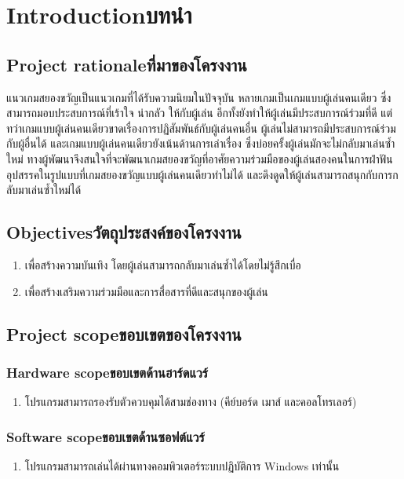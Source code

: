 \chapter{\ifenglish Introduction\else บทนำ\fi}

\section{\ifenglish Project rationale\else ที่มาของโครงงาน\fi}
แนวเกมสยองขวัญเป็นแนวเกมที่ได้รับความนิยมในปัจจุบัน หลายเกมเป็นเกมแบบผู้เล่นคนเดียว ซึ่งสามารถมอบประสบการณ์ที่เร้าใจ น่ากลัว ให้กับผู้เล่น อีกทั้งยังทำให้ผู้เล่นมีประสบการณ์ร่วมที่ดี แต่ทว่าเกมแบบผู้เล่นคนเดียวขาดเรื่องการปฏิสัมพันธ์กับผู้เล่นคนอื่น ผู้เล่นไม่สามารถมีประสบการณ์ร่วมกับผู้อื่นได้ และเกมแบบผู้เล่นคนเดียวยังเน้นด้านการเล่าเรื่อง ซึ่งบ่อยครั้งผู้เล่นมักจะไม่กลับมาเล่นซ้ำใหม่ ทางผู้พัฒนาจึงสนใจที่จะพัฒนาเกมสยองขวัญที่อาศัยความร่วมมือของผู้เล่นสองคนในการฝ่าฟันอุปสรรคในรูปแบบที่เกมสยองขวัญแบบผู้เล่นคนเดียวทำไม่ได้ และดึงดูดให้ผู้เล่นสามารถสนุกกับการกลับมาเล่นซ้ำใหม่ได้

\section{\ifenglish Objectives\else วัตถุประสงค์ของโครงงาน\fi}
\begin{enumerate}
    \item เพื่อสร้างความบันเทิง โดยผู้เล่นสามารถกลับมาเล่นซ้ำได้โดยไม่รู้สึกเบื่อ
    \item เพื่อสร้างเสริมความร่วมมือและการสื่อสารที่ดีและสนุกของผู้เล่น
\end{enumerate}

\section{\ifenglish Project scope\else ขอบเขตของโครงงาน\fi}

\subsection{\ifenglish Hardware scope\else ขอบเขตด้านฮาร์ดแวร์\fi}
\begin{enumerate}
    \item โปรแกรมสามารถรองรับตัวควบคุมได้สามช่องทาง (คีย์บอร์ด เมาส์ และคอลโทรเลอร์)
\end{enumerate}

\subsection{\ifenglish Software scope\else ขอบเขตด้านซอฟต์แวร์\fi}
\begin{enumerate}
    \item โปรแกรมสามารถเล่นได้ผ่านทางคอมพิวเตอร์ระบบปฏิบัติการ Windows เท่านั้น
\end{enumerate}

